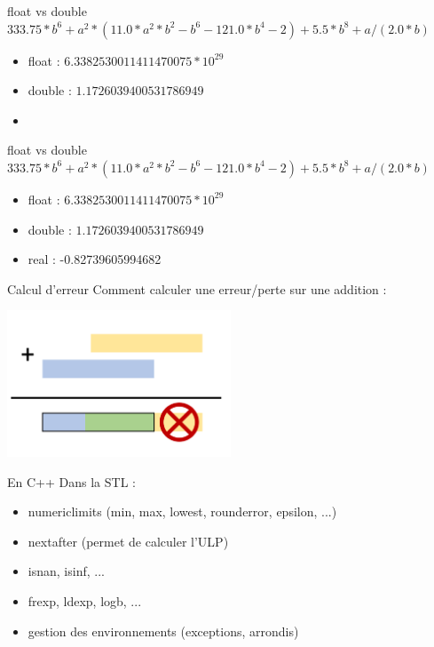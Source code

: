 \documentclass{beamer}
\begin{document}
  \begin{frame}{float vs double}
  $333.75*b^{6}+a^{2}*(11.0*a^{2}*b^{2}-b^{6}-121.0*b^{4}-2)+5.5*b^{8}+a/(2.0*b)$
      \begin{itemize}
\item float : $6.3382530011411470075*10^{29}$
\item double : $1.1726039400531786949$
\item \textcolor{white}{ } 
    \end{itemize}
  \end{frame}
  
  \begin{frame}{float vs double}
  $333.75*b^{6}+a^{2}*(11.0*a^{2}*b^{2}-b^{6}-121.0*b^{4}-2)+5.5*b^{8}+a/(2.0*b)$
      \begin{itemize}
\item float : $6.3382530011411470075*10^{29}$
\item double : $1.1726039400531786949$
\item real :  -0.82739605994682
    \end{itemize}
  \end{frame}  
  
  
    \begin{frame}{Calcul d'erreur}
    Comment calculer une erreur/perte sur une addition :
    \begin{center}
      \includegraphics[width=0.5\textwidth]{addition}
      \errorcomputing
      \end{center}
        \end{frame}
        
  \begin{frame}{En C++}
    Dans la STL :
    \begin{itemize}
    \item numeric\textunderscore limits (min, max, lowest, round\textunderscore error, epsilon, ...)
    \item nextafter (permet de calculer l'ULP)
    \item isnan, isinf, ...
    \item frexp, ldexp, logb, ...
    \item gestion des environnements (exceptions, arrondis)
    \end{itemize}
  \end{frame}
  
\end{document}
